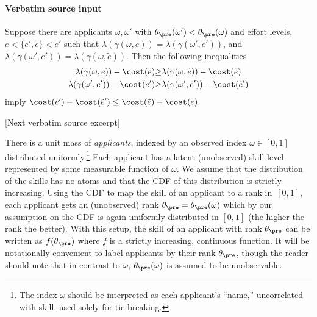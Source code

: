 \documentclass[10pt]{article}
\begin{document}
\paragraph{Verbatim source input}
\begin{ReviewVerbatim}
\begin{lemma}\label{lem:order_p}
Suppose there are applicants $\omega, \omega'$ with $\theta_\pre(\omega') <\theta_\pre(\omega) $ and effort levels, $e<\{\tilde e', \tilde e \}<e'$ such that $\lambda(\gamma(\omega, e)) = \lambda(\gamma(\omega', \tilde e'))$, and $\lambda(\gamma(\omega', e')) = \lambda(\gamma(\omega, \tilde e))$. Then the following inequalities
\begin{align}
        \lambda(\gamma(\omega, e)) - \cost(e) &{\geq }
		\lambda(\gamma(\omega, \tilde e)) - \cost(\tilde e) \label{eq:OPT1} \\
		\lambda(\gamma(\omega', e')) - \cost(e')
		&{\geq}\lambda(\gamma(\omega', \tilde e')) - \cost(\tilde e') \label{eq:OPT2}
\end{align}
imply $\cost(e') - \cost(\tilde e') \leq \cost(\tilde e) - \cost(e). $
\end{lemma}

[Next verbatim source excerpt]

There is a unit mass of \textit{applicants}, indexed by an observed index $\omega \in [0,1]$ distributed uniformly.\footnote{The index $\omega$ should be interpreted as each applicant's ``name,'' uncorrelated with skill, used solely for tie-breaking.}  Each applicant has a latent (unobserved) skill level represented by some measurable function of $\omega$.
We assume that {the distribution of the skills} has no atoms and that the CDF of this distribution is strictly increasing.
Using the CDF to map the skill of an applicant to a rank in~$[0,1]$, each applicant gets an (unobserved) rank $\theta_\pre =\theta_\pre(\omega)$ which by our assumption on the CDF is again uniformly distributed in $[0, 1]$ (the higher the rank the better).  With this setup, the skill of an applicant with rank $\theta_\pre$ can be written as $f(\theta_\pre)$ where $f$ is a strictly increasing, continuous function.  {It will be notationally convenient to label applicants by their rank $\theta_\pre$, though the reader should note that in contrast to $\omega$, $\theta_\pre(\omega)$ is assumed to be unobservable.}




\end{ReviewVerbatim}
\end{document}
